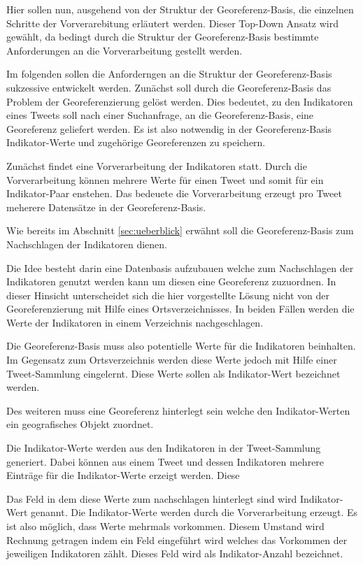  
				Hier sollen nun, ausgehend von der Struktur der Georeferenz-Basis, die einzelnen Schritte der Vorverarebitung erläutert werden. 
				Dieser Top-Down Ansatz wird gewählt, da bedingt durch die Struktur der Georeferenz-Basis bestimmte Anforderungen an die Vorverarbeitung gestellt werden.

				Im folgenden sollen die Anforderngen an die Struktur der Georeferenz-Basis sukzessive entwickelt werden.
				Zunächst soll durch die Georeferenz-Basis das Problem der Georeferenzierung gelöst werden. 
				Dies bedeutet, zu den Indikatoren eines Tweets soll nach einer Suchanfrage, an die Georeferenz-Basis, eine Georeferenz geliefert werden.
				Es ist also notwendig in der Georeferenz-Basis Indikator-Werte und zugehörige Georeferenzen zu speichern.



				
				  

				Zunächst findet eine Vorverarbeitung der Indikatoren statt. 
				Durch die Vorverarbeitung können mehrere Werte für einen Tweet und somit für ein Indikator-Paar enstehen. 
				Das bedeuete die Vorverarbeitung erzeugt pro Tweet meherere Datensätze in der Georeferenz-Basis.

				Wie bereits im Abschnitt \ref{sec:ueberblick} erwähnt soll die Georeferenz-Basis zum Nachschlagen der Indikatoren dienen.  

				Die Idee besteht darin eine Datenbasis aufzubauen welche zum Nachschlagen der Indikatoren genutzt werden kann um diesen eine Georeferenz zuzuordnen.
				In dieser Hinsicht unterscheidet sich die hier vorgestellte Lösung nicht von der Georeferenzierung mit Hilfe eines Ortsverzeichnisses.
				In beiden Fällen werden die Werte der Indikatoren in einem Verzeichnis nachgeschlagen. 
				
				Die Georeferenz-Basis muss also potentielle Werte für die Indikatoren beinhalten.
				Im Gegensatz zum Ortsverzeichnis werden diese Werte jedoch mit Hilfe einer Tweet-Sammlung eingelernt.
				Diese Werte sollen als Indikator-Wert bezeichnet werden.

				Des weiteren muss eine Georeferenz hinterlegt sein welche den Indikator-Werten ein geografisches Objekt zuordnet.

				
				Die Indikator-Werte werden aus den Indikatoren in der Tweet-Sammlung generiert.
				Dabei können aus einem Tweet und dessen Indikatoren mehrere Einträge für die Indikator-Werte erzeigt werden. 
				Diese  

				Das Feld in dem diese Werte zum nachschlagen hinterlegt sind wird Indikator-Wert genannt. 
				Die Indikator-Werte werden durch die Vorverarbeitung erzeugt.   
				Es ist also möglich, dass Werte mehrmals vorkommen. 
				Diesem Umstand wird Rechnung getragen indem ein Feld eingeführt wird welches das Vorkommen der jeweiligen Indikatoren zählt. 
				Dieses Feld wird als Indikator-Anzahl bezeichnet.


